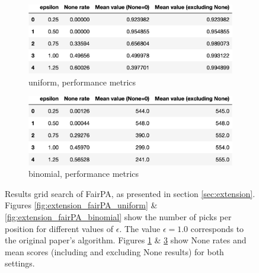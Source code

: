 \begin{figure}[h!]


  \begin{subfigure}[t]{.5\textwidth}
    \centering
    \includegraphics[width=\linewidth]{Images/extension/FairGeneralProphet_uniform_table.jpeg}
    \caption{uniform, performance metrics}
    \label{fig:extension_fairPA_uniform_table}
  \end{subfigure}
  \hfill
  \begin{subfigure}[t]{.5\textwidth}
    \centering
    \includegraphics[width=\linewidth]{Images/extension/FairGeneralProphet_binomial_table.jpeg}
    \caption{binomial, performance metrics}
    \label{fig:extension_fairPA_binomial_table}
  \end{subfigure}
  
  \caption{
    Results grid search of FairPA, as presented in section \ref{sec:extension}. Figures \ref{fig:extension_fairPA_uniform} \& \ref{fig:extension_fairPA_binomial} show the number of picks per position for different values of $\epsilon$. The value $\epsilon = 1.0$ corresponds to the original paper's algorithm. Figures \ref{fig:extension_fairPA_uniform_table} \& \ref{fig:extension_fairPA_binomial_table} show None rates and mean scores (including and excluding None results) for both settings.
    }
\end{figure}



